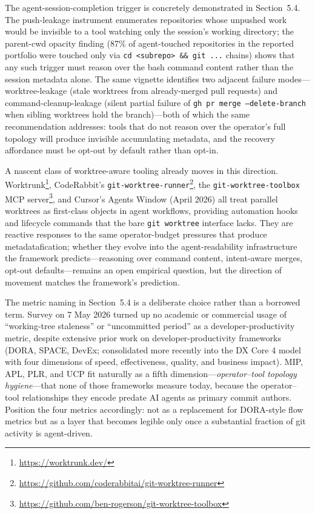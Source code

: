 \documentclass[12pt]{article}
\begin{document}
The agent-session-completion trigger is concretely demonstrated in Section~5.4. The push-leakage instrument enumerates repositories whose unpushed work would be invisible to a tool watching only the session's working directory; the parent-cwd opacity finding (87\% of agent-touched repositories in the reported portfolio were touched only via \texttt{cd \textless subrepo\textgreater\ \&\& git ...} chains) shows that any such trigger must reason over the bash command content rather than the session metadata alone. The same vignette identifies two adjacent failure modes---worktree-leakage (stale worktrees from already-merged pull requests) and command-cleanup-leakage (silent partial failure of \texttt{gh pr merge --delete-branch} when sibling worktrees hold the branch)---both of which the same recommendation addresses: tools that do not reason over the operator's full topology will produce invisible accumulating metadata, and the recovery affordance must be opt-out by default rather than opt-in.

A nascent class of worktree-aware tooling already moves in this direction. Worktrunk\footnote{\url{https://worktrunk.dev/}}, CodeRabbit's \texttt{git-worktree-runner}\footnote{\url{https://github.com/coderabbitai/git-worktree-runner}}, the \texttt{git-worktree-toolbox} MCP server\footnote{\url{https://github.com/ben-rogerson/git-worktree-toolbox}}, and Cursor's Agents Window (April 2026) all treat parallel worktrees as first-class objects in agent workflows, providing automation hooks and lifecycle commands that the bare \texttt{git worktree} interface lacks. They are reactive responses to the same operator-budget pressures that produce metadatafication; whether they evolve into the agent-readability infrastructure the framework predicts---reasoning over command content, intent-aware merges, opt-out defaults---remains an open empirical question, but the direction of movement matches the framework's prediction.

The metric naming in Section~5.4 is a deliberate choice rather than a borrowed term. Survey on 7 May 2026 turned up no academic or commercial usage of ``working-tree staleness'' or ``uncommitted period'' as a developer-productivity metric, despite extensive prior work on developer-productivity frameworks (DORA, SPACE, DevEx; consolidated more recently into the DX Core 4 model with four dimensions of speed, effectiveness, quality, and business impact). MIP, APL, PLR, and UCP fit naturally as a fifth dimension---\textit{operator--tool topology hygiene}---that none of those frameworks measure today, because the operator--tool relationships they encode predate AI agents as primary commit authors. Position the four metrics accordingly: not as a replacement for DORA-style flow metrics but as a layer that becomes legible only once a substantial fraction of git activity is agent-driven.
\end{document}
